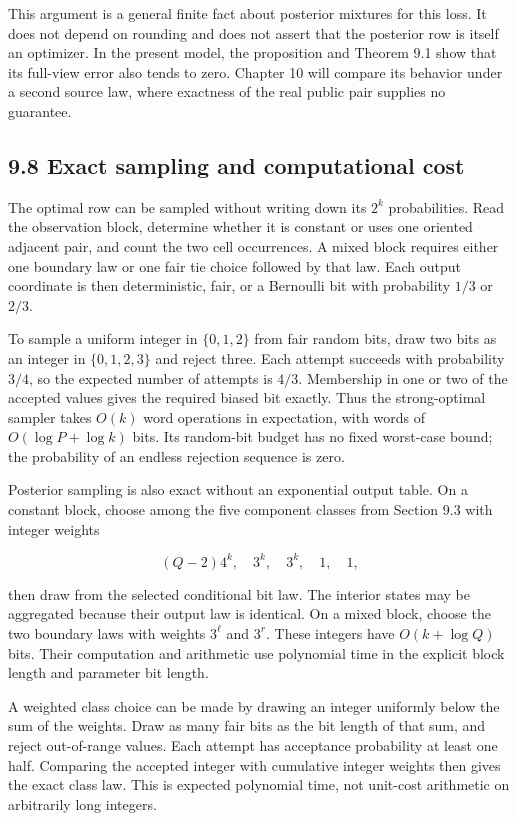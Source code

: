 \documentclass[
]{article}
\begin{document}
This argument is a general finite fact about posterior mixtures for this
loss. It does not depend on rounding and does not assert that the
posterior row is itself an optimizer. In the present model, the
proposition and Theorem 9.1 show that its full-view error also tends to
zero. Chapter 10 will compare its behavior under a second source law,
where exactness of the real public pair supplies no guarantee.

\subsection{9.8 Exact sampling and computational
cost}\label{exact-sampling-and-computational-cost}

The optimal row can be sampled without writing down its \(2^k\)
probabilities. Read the observation block, determine whether it is
constant or uses one oriented adjacent pair, and count the two cell
occurrences. A mixed block requires either one boundary law or one fair
tie choice followed by that law. Each output coordinate is then
deterministic, fair, or a Bernoulli bit with probability \(1/3\) or
\(2/3\).

To sample a uniform integer in \(\{0,1,2\}\) from fair random bits, draw
two bits as an integer in \(\{0,1,2,3\}\) and reject three. Each attempt
succeeds with probability \(3/4\), so the expected number of attempts is
\(4/3\). Membership in one or two of the accepted values gives the
required biased bit exactly. Thus the strong-optimal sampler takes
\(O(k)\) word operations in expectation, with words of
\(O(\log P+\log k)\) bits. Its random-bit budget has no fixed worst-case
bound; the probability of an endless rejection sequence is zero.

Posterior sampling is also exact without an exponential output table. On
a constant block, choose among the five component classes from Section
9.3 with integer weights

\[
(Q-2)4^k,\quad3^k,\quad3^k,\quad1,\quad1,
\]

then draw from the selected conditional bit law. The interior states may
be aggregated because their output law is identical. On a mixed block,
choose the two boundary laws with weights \(3^\ell\) and \(3^r\). These
integers have \(O(k+\log Q)\) bits. Their computation and arithmetic use
polynomial time in the explicit block length and parameter bit length.

A weighted class choice can be made by drawing an integer uniformly
below the sum of the weights. Draw as many fair bits as the bit length
of that sum, and reject out-of-range values. Each attempt has acceptance
probability at least one half. Comparing the accepted integer with
cumulative integer weights then gives the exact class law. This is
expected polynomial time, not unit-cost arithmetic on arbitrarily long
integers.
\end{document}
